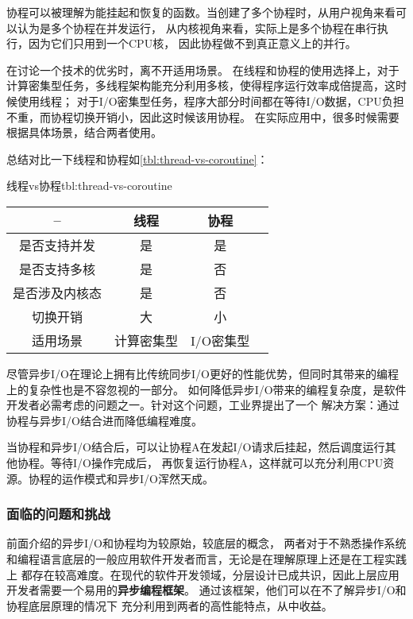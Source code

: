 \documentclass[supercite]{HustGraduPaper}
\newcommand{\rtbl}[1]{\autoref{tbl:#1}}
\theoremstyle{definition}
\begin{document}
协程可以被理解为能挂起和恢复的函数。当创建了多个协程时，从用户视角来看可以认为是多个协程在并发运行，
从内核视角来看，实际上是多个协程在串行执行，因为它们只用到一个CPU核，
因此协程做不到真正意义上的并行\cite{bogaerts2010concurrency}。\par

在讨论一个技术的优劣时，离不开适用场景。
在线程和协程的使用选择上，对于计算密集型任务，多线程架构能充分利用多核，使得程序运行效率成倍提高，这时候使用线程；
对于I/O密集型任务，程序大部分时间都在等待I/O数据，CPU负担不重，而协程切换开销小，因此这时候该用协程。
在实际应用中，很多时候需要根据具体场景，结合两者使用。\par

总结对比一下线程和协程如\rtbl{thread-vs-coroutine}：

\begin{generaltab}{线程vs协程}{tbl:thread-vs-coroutine}
  \begin{tabular}{c|ccc}
    \toprule
    -- & 线程 & 协程 \\
    \midrule
    是否支持并发 & 是 & 是 \\
    是否支持多核 & 是 & 否 \\
    是否涉及内核态 & 是 & 否 \\
    切换开销 & 大 & 小 \\
    适用场景 & 计算密集型 & I/O密集型 \\
    \bottomrule
  \end{tabular}
\end{generaltab}

尽管异步I/O在理论上拥有比传统同步I/O更好的性能优势，但同时其带来的编程上的复杂性也是不容忽视的一部分。
如何降低异步I/O带来的编程复杂度，是软件开发者必需考虑的问题之一。针对这个问题，工业界提出了一个
解决方案：通过协程与异步I/O结合进而降低编程难度。\par

当协程和异步I/O结合后，可以让协程A在发起I/O请求后挂起，然后调度运行其他协程。等待I/O操作完成后，
再恢复运行协程A，这样就可以充分利用CPU资源。协程的运作模式和异步I/O浑然天成。\par

\subsubsection{面临的问题和挑战}
前面介绍的异步I/O和协程均为较原始，较底层的概念，
两者对于不熟悉操作系统和编程语言底层的一般应用软件开发者而言，无论是在理解原理上还是在工程实践上
都存在较高难度。在现代的软件开发领域，分层设计已成共识，因此上层应用开发者需要一个易用的\textbf{异步编程框架}。
通过该框架，他们可以在不了解异步I/O和协程底层原理的情况下
充分利用到两者的高性能特点，从中收益。\par
\end{document}
